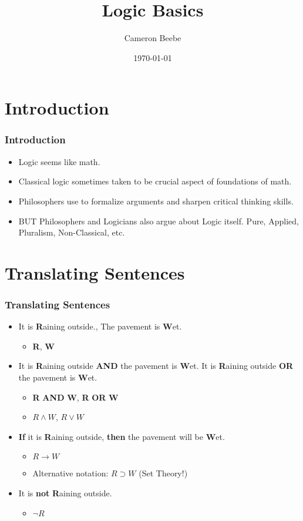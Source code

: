 \documentclass{beamer}
\title{Logic Basics}
\author{Cameron Beebe}
\institute
{
The SciPhi Initiative, LLC
\medskip
}
\date{\today}
\begin{document}
\frame{\titlepage}

\section[Outline]{}
\frame{\tableofcontents}


\section{Introduction}
\frame
{
\frametitle{Introduction}

\begin{itemize}
    \item<1->  Logic seems like math.
    \item<2->  Classical logic sometimes taken to be crucial aspect of foundations of math.
    \item<3->  Philosophers use to formalize arguments and sharpen critical thinking skills.
    \item<4->  BUT Philosophers and Logicians also argue about Logic itself.  Pure, Applied, Pluralism, Non-Classical, etc.
\end{itemize}


}




\section{Translating Sentences}
\frame
{
  \frametitle{Translating Sentences}

  \begin{itemize}
  \item<1->  It is \textbf{R}aining outside., The pavement is \textbf{W}et.
  \begin{itemize}
      \item<2->  \textbf{R}, \textbf{W}
  \end{itemize}
  \item<3->  It is \textbf{R}aining outside \textbf{AND} the pavement is \textbf{W}et.  It is \textbf{R}aining outside \textbf{OR} the pavement is \textbf{W}et.
  \begin{itemize}
  \item<4->  \textbf{R} \textbf{AND} \textbf{W}, \textbf{R} \textbf{OR} \textbf{W}
  \item<5->  $R \land W$, $R \lor W$
  \end{itemize}
  \item<6->  \textbf{If} it is \textbf{R}aining outside, \textbf{then} the pavement will be \textbf{W}et.
  \begin{itemize}
      \item<7->  $R \rightarrow W$
      \item<8-> Alternative notation: $R \supset W$ (Set Theory!)
  \end{itemize}  
  \item<9->  It is \textbf{not} \textbf{R}aining outside.
  \begin{itemize}
      \item<10-> $\lnot R$ 
  \end{itemize}
  \end{itemize}
}
\end{document}
